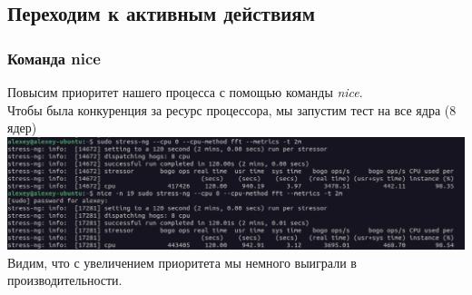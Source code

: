 \subsection{Переходим к активным действиям}
\subsubsection{Команда nice}
Повысим приоритет нашего процесса с помощью команды \textit{nice}.\\
Чтобы была конкуренция за ресурс процессора, мы запустим тест на все ядра (8 ядер)\\
\includegraphics[width=\textwidth]{image/nice.png}
Видим, что с увеличением приоритета мы немного выиграли в производительности.
